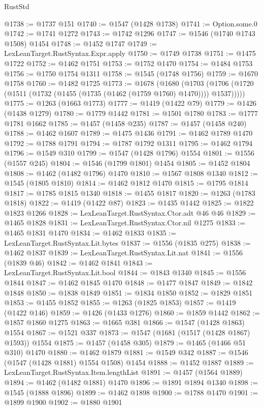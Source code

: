 \begin{lexlean}{RustStd}
\begin{coremodule}
{\begin{coremodule}
{{{{{{{{{{{{{{{{{{{{{{{{{{{{{{@1738 := @1737 @151
@1740 := @1547 (@1428 @1738)
@1741 := Option.some.{0}
@1742 := @1741 @1272
@1743 := @1742 @1296
@1747 := @1546 (@1740 @1743 @1508) @1454
@1748 := @1452 @1747
@1749 := LexLeanTarget.RustSyntax.Expr.apply
@1750 := @1749 @1738
@1751 := @1475 @1722
@1752 := @1462 @1751
@1753 := @1752 @1470
@1754 := @1484 @1753
@1756 := @1750 @1754 @1311
@1758 := @1545 (@1748 @1756)
@1759 := @1670 @1758
@1760 := @1482 @1725
@1773 := @1678
    (@1680
      (@1703 (@1706 (@1720 (@1511 (@1732 (@1455 (@1735 (@1462 (@1759 @1760) @1470)))) @1537)))))
@1775 := @1263 (@1663 @1773)
@1777 := @1419 (@1422 @79)
@1779 := @1426 (@1438 @1279)
@1780 := @1779 @1442
@1781 := @1501 @1780
@1783 := @1777 @1781 @1662
@1785 := @1457 (@1458 @235)
@1787 := @1457 (@1458 @240)
@1788 := @1462 @1607
@1789 := @1475 @1436
@1791 := @1462 @1789 @1470
@1792 := @1788 @1791
@1794 := @1787 @1792 @1311
@1795 := @1462 @1794
@1796 := @1549 @310
@1799 := @1547 (@1428 @1796) @1554
@1801 := @1556 (@1557 @245)
@1804 := @1546 (@1799 @1801) @1454
@1805 := @1452 @1804
@1808 := @1462 (@1482 @1796) @1470
@1810 := @1567 @1808 @1340
@1812 := @1545 (@1805 @1810)
@1814 := @1462 @1812 @1470
@1815 := @1795 @1814
@1817 := @1785 @1815 @1340
@1818 := @1455 @1817
@1820 := @1263 (@1783 @1818)
@1822 := @1419 (@1422 @87)
@1823 := @1435 @1442
@1825 := @1822 @1823 @1266
@1828 := LexLeanTarget.RustSyntax.Ctor.adt @46 @46
@1829 := @1465 @1828
@1831 := LexLeanTarget.RustSyntax.Ctor.nil @1275
@1833 := @1465 @1831 @1470
@1834 := @1462 @1833
@1835 := LexLeanTarget.RustSyntax.Lit.bytes
@1837 := @1556 (@1835 @275)
@1838 := @1462 @1837
@1839 := LexLeanTarget.RustSyntax.Lit.nat
@1841 := @1556 (@1839 @46)
@1842 := @1462 @1841
@1843 := LexLeanTarget.RustSyntax.Lit.bool
@1844 := @1843 @1340
@1845 := @1556 @1844
@1847 := @1462 @1845 @1470
@1848 := @1477 @1847
@1849 := @1842 @1848
@1850 := @1838 @1849
@1851 := @1834 @1850
@1852 := @1829 @1851
@1853 := @1455 @1852
@1855 := @1263 (@1825 @1853)
@1857 := @1419 (@1422 @146)
@1859 := @1426 (@1433 @1276)
@1860 := @1859 @1442
@1862 := @1857 @1860 @1275
@1863 := @1665 @381
@1866 := @1547 (@1428 @1863) @1554
@1867 := @1521 @337
@1873 := @1547 (@1681 (@1517 (@1428 @1867) @1593)) @1554
@1875 := @1457 (@1458 @305)
@1879 := @1465 (@1466 @51 @310) @1470
@1880 := @1462 @1879
@1881 := @1549 @342
@1887 := @1546 (@1547 (@1428 @1881) @1554 @1508) @1454
@1888 := @1452 @1887
@1889 := LexLeanTarget.RustSyntax.Item.lengthList
@1891 := @1457 (@1564 @1889)
@1894 := @1462 (@1482 @1881) @1470
@1896 := @1891 @1894 @1340
@1898 := @1545 (@1888 @1896)
@1899 := @1462 @1898
@1900 := @1788 @1470
@1901 := @1899 @1900
@1902 := @1880 @1901
}}}}}}}}}}}}}}}}}}}}}}}}}}}}}}
\end{coremodule}}
\end{coremodule}
\end{lexlean}
